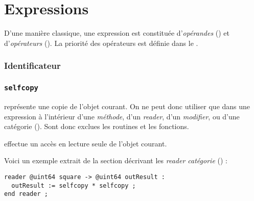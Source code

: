 
\chapter{Expressions}

D'une manière classique, une expression est constituée d'\emph{opérandes} () et d'\emph{opérateurs} (). La priorité des opérateurs est définie dans le .





\subsection{Identificateur}

\subsection{\texttt{selfcopy}}

 représente une copie de l'objet courant. On ne peut donc utiliser  que dans une expression à l'intérieur d'une \emph{méthode}, d'un \emph{reader}, d'un \emph{modifier}, ou d'une catégorie (). Sont donc exclues les routines et les fonctions.

 effectue un accès en lecture seule de l'objet courant. 

Voici un exemple extrait de la section décrivant les \emph{reader catégorie} () :
\begin{lstlisting}[language=galgas]
reader @uint64 square -> @uint64 outResult :
  outResult := selfcopy * selfcopy ;
end reader ;
\end{lstlisting}










